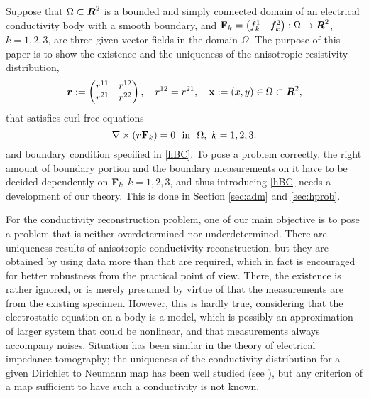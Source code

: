 \documentclass[11pt]{amsart}
\def\blue{\color{blue}}
\theoremstyle{plain}
\theoremstyle{remark}
\numberwithin{equation}{section}
\numberwithin{Thm}{section}
\def\R{\mbox{\boldmath$R$}}
\def\N{{\mathbf N}}
\def\F{{\bf F}}
\def\r{{\bf r}}
\def\x{{\bf x}}
\def\r{\mbox{\boldmath$r$}}
\begin{document}
Suppose that $\Omega\subset\R^2$ is a bounded and {simply connected} domain of an electrical conductivity body with a smooth boundary, and $\F_k=\begin{pmatrix} f^1_k & f^2_k \end{pmatrix}:\Omega\to\R^2$, $k=1,2,3$, are three given vector fields in the domain $\Omega$. The purpose of this paper is to show the existence and the uniqueness of the anisotropic resistivity distribution,
\begin{equation}\label{ortho}
\r:=\begin{pmatrix}r^{11}&r^{12} \\ r^{21}& r^{22}\end{pmatrix},\quad r^{12}=r^{21},\quad \x:=(x,y)\in\Omega\subset\R^2,
\end{equation}
that satisfies curl free equations
\begin{equation}\label{Faraday}
\nabla\times(\r\F_k )=0\ \ \mbox{in}\ \ \Omega,\ k=1,2,3.
\end{equation}
and boundary condition specified in \eqref{hBC}. To pose a problem correctly, the right amount of boundary portion and the boundary measurements on it have to be decided dependently on $\F_k$ $k=1,2,3$, and thus introducing \eqref{hBC} needs a development of our theory. This is done in Section \ref{sec:adm} and \ref{sec:hprob}.
% 

For the conductivity reconstruction problem, one of our main objective is to pose a problem that is neither overdetermined nor underdetermined. There are uniqueness results of anisotropic conductivity reconstruction, but they are obtained by using data more than that are required, which in fact is encouraged for better robustness from the practical point of view. There, the existence is rather ignored, or is merely presumed by virtue of that the measurements are from the existing specimen. However, this is hardly true, considering that the electrostatic equation on a body is a model, which is possibly an approximation of larger system that could be nonlinear, and that measurements always accompany noises. Situation has been similar in the theory of electrical impedance tomography; the uniqueness of the conductivity distribution for a given Dirichlet to Neumann map has been well studied (see \cite{nachman_global_1996,sylvester_global_1987}), but any criterion of a map sufficient to have such a conductivity is not known. 
\end{document}
